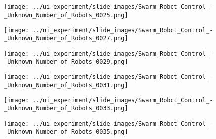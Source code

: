 \begin{minipage}{\linewidth}
	\centering
	\begin{minipage}{0.42\linewidth}
		\texttt{[image: ../ui\_experiment/slide\_images/Swarm\_Robot\_Control\_-\_Unknown\_Number\_of\_Robots\_0025.png]}
		\label{fig:sub1}
	\end{minipage}
	\hspace{0.05\linewidth}
	\begin{minipage}{0.42\linewidth}
		\texttt{[image: ../ui\_experiment/slide\_images/Swarm\_Robot\_Control\_-\_Unknown\_Number\_of\_Robots\_0027.png]}
		\label{fig:sub1}
	\end{minipage}
\end{minipage}

\begin{minipage}{\linewidth}
	\centering
	\begin{minipage}{0.42\linewidth}
		\texttt{[image: ../ui\_experiment/slide\_images/Swarm\_Robot\_Control\_-\_Unknown\_Number\_of\_Robots\_0029.png]}
		\label{fig:sub2}
	\end{minipage}
	\hspace{0.05\linewidth}
	\begin{minipage}{0.42\linewidth}
		\texttt{[image: ../ui\_experiment/slide\_images/Swarm\_Robot\_Control\_-\_Unknown\_Number\_of\_Robots\_0031.png]}
		\label{fig:sub1}
	\end{minipage}
\end{minipage}

\begin{minipage}{\linewidth}
	\centering
	\begin{minipage}{0.42\linewidth}
		\texttt{[image: ../ui\_experiment/slide\_images/Swarm\_Robot\_Control\_-\_Unknown\_Number\_of\_Robots\_0033.png]}
		\label{fig:sub2}
	\end{minipage}
	\hspace{0.05\linewidth}
	\begin{minipage}{0.42\linewidth}
		\texttt{[image: ../ui\_experiment/slide\_images/Swarm\_Robot\_Control\_-\_Unknown\_Number\_of\_Robots\_0035.png]}
		\label{fig:sub1}
	\end{minipage}
\end{minipage}